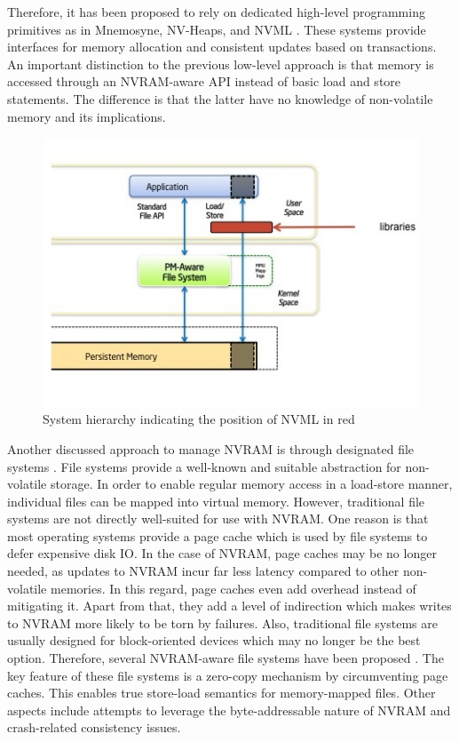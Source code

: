 Therefore, it has been proposed to rely on dedicated high-level programming
primitives as in Mnemosyne, NV-Heaps, and NVML \cite{volos2011mnemosyne,
coburn2011nv_heaps, intel2017nvml}. These systems provide interfaces for memory
allocation and consistent updates based on transactions. An important
distinction to the previous low-level approach is that memory is accessed
through an NVRAM-aware API instead of basic load and store statements. The
difference is that the latter have no knowledge of non-volatile memory and its
implications.

\begin{figure}[!ht]
    \centering
    \includegraphics[scale=0.75]{figures/nvml-arch.jpg}
    \caption{System hierarchy indicating the position of NVML in red \cite{intel2014nvml}}
    \label{fig:nvml}
\end{figure}

Another discussed approach to manage NVRAM is through designated file systems
\cite{oukid2017data, andrei2017sap}. File systems provide a well-known and
suitable abstraction for non-volatile storage. In order to enable regular memory
access in a load-store manner, individual files can be mapped into virtual
memory. However, traditional file systems are not directly well-suited for use
with NVRAM. One reason is that most operating systems provide a page cache which
is used by file systems to defer expensive disk IO. In the case of NVRAM, page
caches may be no longer needed, as updates to NVRAM incur far less latency
compared to other non-volatile memories. In this regard, page caches even add
overhead instead of mitigating it. Apart from that, they add a level of
indirection which makes writes to NVRAM more likely to be torn by failures.
Also, traditional file systems are usually designed for block-oriented devices
which may no longer be the best option. Therefore, several NVRAM-aware file
systems have been proposed \cite{condit2009better, wu2011scmfs,
dulloor2014system, xu2016nova}. The key feature of these file systems is a
zero-copy mechanism by circumventing page caches. This enables true store-load
semantics for memory-mapped files. Other aspects include attempts to leverage
the byte-addressable nature of NVRAM and crash-related consistency issues.

